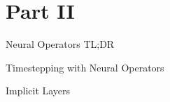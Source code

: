 \documentclass[usenames,dvipsnames]{beamer}
\theoremstyle{definition}
\begin{document}

    

        




        

    
    



\section{Part II}
\begin{frame}{Neural Operators TL;DR}



\end{frame}


\begin{frame}{Timestepping with Neural Operators}


\end{frame}

\begin{frame}{Implicit Layers}


\end{frame}
\end{document}
